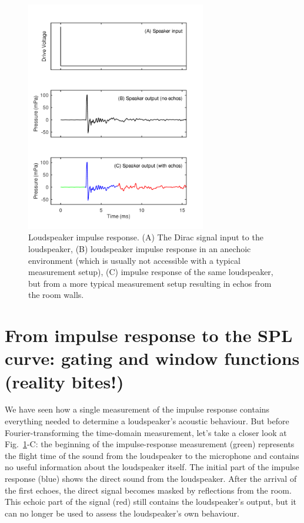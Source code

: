 \documentclass[12pt,a4paper]{article}
\providecommand{\figlabel}[1]{\label{fig:#1}}
\providecommand{\figr}[1]{Fig.~\ref{fig:#1}}
\begin{document}
\begin{figure}[tbp]
  \begin{center}
    \includegraphics[width=0.7\textwidth]{FIGURE1}
    \caption{Loudspeaker impulse response. (A) The Dirac signal input to the loudspeaker, (B) loudspeaker impulse response in an anechoic environment (which is usually not accessible with a typical measurement setup), (C) impulse response of the same loudspeaker, but from a more typical measurement setup resulting in echos from the room walls.}
    \figlabel{FIGURE1}
  \end{center}
\end{figure}

\section{From impulse response to the SPL curve: gating and window functions (reality bites!)}

We have seen how a single measurement of the impulse response contains everything needed to determine a loudspeaker’s acoustic behaviour.
But before Fourier-transforming the time-domain measurement, let's take a closer look at \figr{FIGURE1}-C: the beginning of the impulse-response measurement (green) represents the flight time of the sound from the loudspeaker to the microphone and contains no useful information about the loudspeaker itself.
The initial part of the impulse response (blue) shows the direct sound from the loudspeaker.
After the arrival of the first echoes, the direct signal becomes masked by reflections from the room.
This echoic part of the signal (red) still contains the loudspeaker’s output, but it can no longer be used to assess the loudspeaker’s own behaviour.
\end{document}
